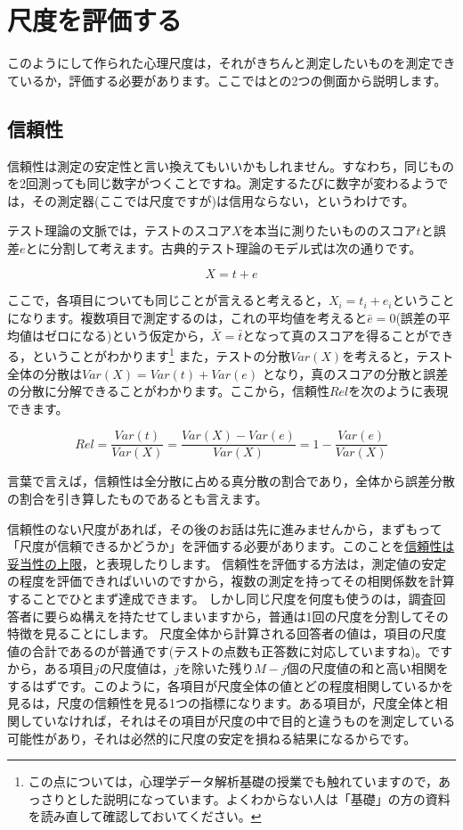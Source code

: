 \documentclass{ltjsbook}
\begin{document}
\section{尺度を評価する}
このようにして作られた心理尺度は，それがきちんと測定したいものを測定できているか，評価する必要があります。ここではとの2つの側面から説明します。
\subsection{信頼性}
信頼性は測定の安定性と言い換えてもいいかもしれません。すなわち，同じものを2回測っても同じ数字がつくことですね。測定するたびに数字が変わるようでは，その測定器(ここでは尺度ですが)は信用ならない，というわけです。

テスト理論の文脈では，テストのスコア$X$を本当に測りたいもののスコア$t$と誤差$e$とに分割して考えます。古典的テスト理論のモデル式は次の通りです。

\[ X = t + e \]

ここで，各項目についても同じことが言えると考えると，$X_i = t_i + e_i$ということになります。複数項目で測定するのは，これの平均値を考えると$\bar{e}=0$(誤差の平均値はゼロになる)という仮定から，$\bar{X}=\bar{t}$となって真のスコアを得ることができる，ということがわかります\footnote{この点については，心理学データ解析基礎の授業でも触れていますので，あっさりとした説明になっています。よくわからない人は「基礎」の方の資料を読み直して確認しておいてください。}
また，テストの分散$Var(X)$を考えると，テスト全体の分散は$Var(X)=Var(t)+Var(e)$ となり，真のスコアの分散と誤差の分散に分解できることがわかります。ここから，信頼性$Rel$を次のように表現できます。

\[Rel = \frac{Var(t)}{Var(X)}= \frac{Var(X)-Var(e)}{Var(X)} = 1-\frac{Var(e)}{Var(X)}\]

言葉で言えば，信頼性は全分散に占める真分散の割合であり，全体から誤差分散の割合を引き算したものであるとも言えます。

信頼性のない尺度があれば，その後のお話は先に進みませんから，まずもって「尺度が信頼できるかどうか」を評価する必要があります。このことを\underline{信頼性は妥当性の上限}，と表現したりします。
信頼性を評価する方法は，測定値の安定の程度を評価できればいいのですから，複数の測定を持ってその相関係数を計算することでひとまず達成できます。
しかし同じ尺度を何度も使うのは，調査回答者に要らぬ構えを持たせてしまいますから，普通は1回の尺度を分割してその特徴を見ることにします。
尺度全体から計算される回答者の値は，項目の尺度値の合計であるのが普通です(テストの点数も正答数に対応していますね)。ですから，ある項目$j$の尺度値は，$j$を除いた残り$M-j$個の尺度値の和と高い相関をするはずです。このように，各項目が尺度全体の値とどの程度相関しているかを見るは，尺度の信頼性を見る1つの指標になります。ある項目が，尺度全体と相関していなければ，それはその項目が尺度の中で目的と違うものを測定している可能性があり，それは必然的に尺度の安定を損ねる結果になるからです。
\end{document}
